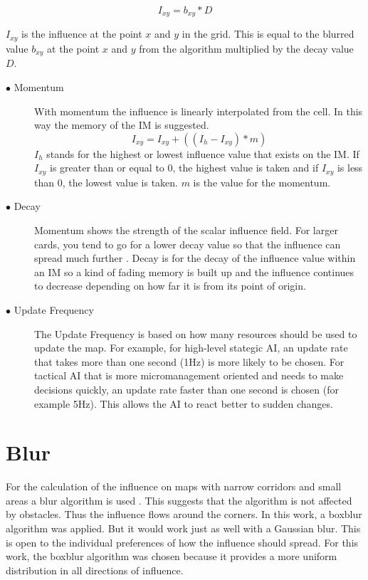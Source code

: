 \documentclass[]{report}
\begin{document}
	\begin{equation}
		I_{xy} = b_{xy} * D
	\end{equation}
	
	$I_{xy}$ is the influence at the point $x$ and $y$ in the grid. This is equal to the blurred value $b_{xy}$ at the point $x$ and $y$ from the algorithm multiplied by the decay value $D$.
	
	
	\begin{description}
		\item[$\bullet$ Momentum] With momentum the influence is linearly interpolated from the cell. In this way the memory of the \ac{IM} is suggested.
		\begin{equation}
			I_{xy} = I_{xy} + ((I_{h} - I_{xy}) * m) 
		\end{equation}
		$I_{h}$ stands for the highest or lowest influence value that exists on the \ac{IM}. If $I_{xy}$ is greater than or equal to $0$, the highest value is taken and if $I_{xy}$ is less than $0$, the lowest value is taken. $m$ is the value for the momentum. 
		
		\item[$\bullet$ Decay] Momentum shows the strength of the scalar influence field. For larger cards, you tend to go for a lower decay value so that the influence can spread much further \citep{imPathfinding}.  Decay is for the decay of the influence value within an \ac{IM} so a kind of fading memory is built up and the influence continues to decrease depending on how far it is from its point of origin.
		\item[$\bullet$ Update Frequency] The Update Frequency is based on how many resources should be used to update the map. For example, for high-level stategic \ac{AI}, an update rate that takes more than one second (1Hz) is more likely to be chosen. For tactical \ac{AI} that is more micromanagement oriented and needs to make decisions quickly, an update rate faster than one second is chosen (for example 5Hz). This allows the \ac{AI} to react better to sudden changes. \citep{gameDevInfluenceMap} \citep{imPathfinding}
		\end {description}
		
		\newpage
		\section{Blur} \label{ssec:num1}
		For the calculation of the influence on maps with narrow corridors and small areas a blur algorithm is used \citep{gameDevInfluenceMap}. \newline This suggests that the algorithm is not affected by obstacles. Thus the influence flows around the corners. In this work, a boxblur algorithm was applied. But it would work just as well with a Gaussian blur. This is open to the individual preferences of how the influence should spread. For this work, the boxblur algorithm was chosen because it provides a more uniform distribution in all directions of influence. 
		
\end{document}
